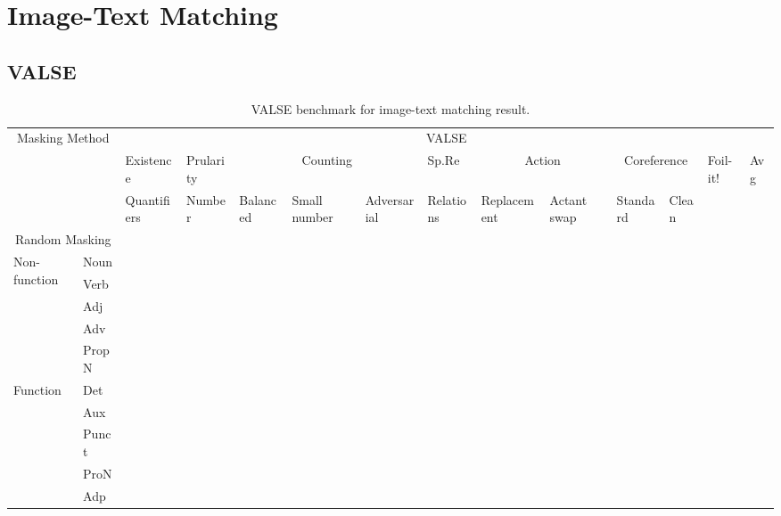\section{Image-Text Matching}

\subsection{VALSE}
\begin{table}[]
    \centering
    \label{tab:valse}
    \caption{VALSE benchmark for image-text matching result.}
    \begin{adjustbox}{width=1\textwidth}
        \begin{tabular}{ll|llllllllllll}
            \multicolumn{2}{c|}{\multirow{3}{*}{Masking Method}} & \multicolumn{12}{c}{VALSE} \\
            & & Existence & Prularity & \multicolumn{3}{c}{Counting} & Sp.Re \footnotemark & \multicolumn{2}{c}{Action} & \multicolumn{2}{c}{Coreference} & \multirow{2}{*}{Foil-it!} & \multirow{2}{*}{Avg} \\
            & & Quantifiers & Number & Balanced & Small number & Adversarial & Relations & Replacement & Actant swap & Standard & Clean & & \\
            \hline
            \multicolumn{2}{c|}{Random Masking}  & & & & & & & & & & & & \\
            \hline
            \multirow{5}{*}{Non-function} & Noun & & & & & & & & & & & & \\
            & Verb & & & & & & & & & & & & \\
            & Adj & & & & & & & & & & & & \\
            & Adv & & & & & & & & & & & & \\
            & PropN & & & & & & & & & & & & \\
            \hline
            \multirow{5}{*}{Function} & Det & & & & & & & & & & & & \\
            & Aux & & & & & & & & & & & & \\
            & Punct & & & & & & & & & & & & \\
            & ProN & & & & & & & & & & & & \\
            & Adp & & & & & & & & & & & & \\
        \end{tabular}
    \end{adjustbox}
\end{table}

